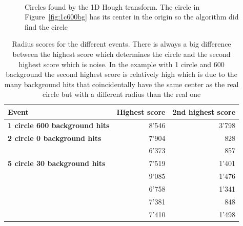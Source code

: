 \documentclass[11pt,twoside]{scrreprt}
\begin{document}
\begin{figure}[htp]
        \centering
        ~ %
                \label{fig:2c0bg}
        ~ %
                \label{fig:5c30bg}
        \caption{Circles found by the 1D Hough transform. The circle in Figure~\ref{fig:1c600bg} has its center in the origin so the algorithm did find the circle}\label{fig:1d_ht_results}
\end{figure}

\begin{table}[tbp]
  \caption{Radius scores for the different events. There is always a big difference between the highest score
  which determines the circle and the second highest score which is noise. In the example with 1 circle and 600
  background the second highest score is relatively high which is due to the many background hits that coincidentally
  have the same center as the real circle but with a different radius than the real one}
  \label{tab:1d_scores}
  \centering

  \begin{tabular}{lrr}
  \toprule




  \midrule
  \textbf{Event} & \textbf{Highest score} & \textbf{2nd highest score} \\
  \midrule
  \textbf{1 circle 600 background hits} & 8'546 & 3'798\\
  \midrule
  \textbf{2 circle 0 background hits} & 7'904 & 828\\
   & 6'373 & 857\\
  \midrule
  \textbf{5 circle 30 background hits} & 7'519 & 1'401\\
  & 9'085 & 1'476\\
  & 6'758 & 1'341\\
  & 7'381 & 848\\
  & 7'410 & 1'498\\
  \bottomrule
  \end{tabular}
\end{table}
\end{document}
